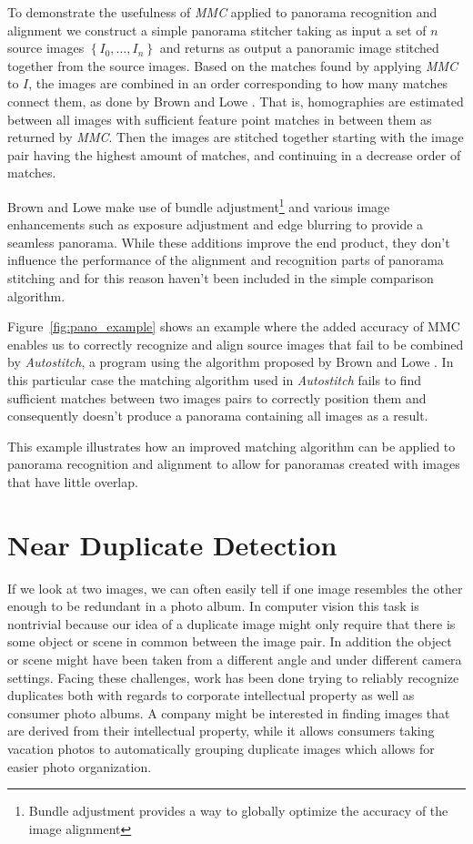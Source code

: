 To demonstrate the usefulness of \emph{MMC} applied to panorama 
recognition and alignment we construct a simple panorama stitcher taking
as input a set of $n$ source images $\left\{I_0, \ldots, I_n\right\}$ 
and returns as output a panoramic image stitched together from the 
source images. Based on the matches found by applying \emph{MMC} to $I$, 
the images are combined in an order corresponding to how many matches 
connect them, as done by Brown and Lowe \cite{brown2007automatic}. That 
is, homographies are estimated between all images with sufficient 
feature point matches in between them as returned by \emph{MMC}. Then 
the images are stitched together starting with the image pair having the 
highest amount of matches, and continuing in a decrease order of 
matches.

Brown and Lowe make use of bundle adjustment\footnote{Bundle adjustment 
provides a way to globally optimize the accuracy of the image alignment} 
and various image enhancements such as exposure adjustment and edge 
blurring to provide a seamless panorama. While these additions improve 
the end product, they don't influence the performance of the alignment 
and recognition parts of panorama stitching and for this reason haven't 
been included in the simple comparison algorithm.

Figure~\ref{fig:pano_example} shows an example where the added accuracy 
of MMC enables us to correctly recognize and align source images that 
fail to be combined by \emph{Autostitch}, a program using the algorithm 
proposed by Brown and Lowe \cite{brown2007automatic}. In this particular
case the matching algorithm used in \emph{Autostitch} fails to find sufficient 
matches between two images pairs to correctly position them and 
consequently doesn't produce a panorama containing all images as a 
result.

This example illustrates how an improved matching algorithm can be 
applied to panorama recognition and alignment to allow for panoramas 
created with images that have little overlap.

\section{Near Duplicate Detection}
If we look at two images, we can often easily tell if one image 
resembles the other enough to be redundant in a photo album. In computer 
vision this task is nontrivial because our idea of a duplicate image 
might only require that there is some object or scene in common between 
the image pair. In addition the object or scene might have been taken 
from a different angle and under different camera settings. Facing these 
challenges, work has been done trying to reliably recognize duplicates 
both with regards to corporate intellectual property as well as consumer 
photo albums.  A company might be interested in finding images that are 
derived from their intellectual property, while it allows consumers 
taking vacation photos to automatically grouping duplicate images which 
allows for easier photo organization.

